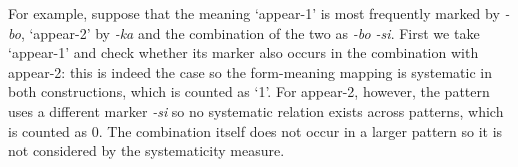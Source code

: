 For example, suppose that the meaning `appear-1' is most frequently marked by {\em -bo}, `appear-2' by {\em -ka} and the combination of the two as {\em -bo -si}. First we take `appear-1' and check whether its marker also occurs in the combination with appear-2: this is indeed the case so the form-meaning mapping is systematic in both constructions, which is counted as `1'. For appear-2, however, the pattern uses a different marker {\em -si} so no systematic relation exists across patterns, which is counted as 0. The combination itself does not occur in a larger pattern so it is not considered by the systematicity measure.
